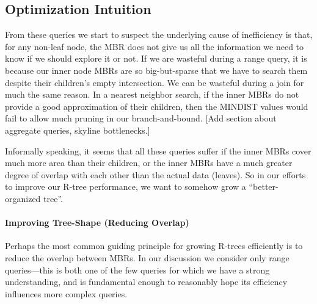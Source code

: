 \subsection{Optimization Intuition}

From these queries we start to suspect the underlying cause of inefficiency is that, for any non-leaf node, the MBR does not give us all the information we need to know if we should explore it or not.
If we are wasteful during a range query, it is because our inner node MBRs are so big-but-sparse that we have to search them despite their children's empty intersection.
We can be wasteful during a join for much the same reason.
In a nearest neighbor search, if the inner MBRs do not provide a good approximation of their children, then the MINDIST values would fail to allow much pruning in our branch-and-bound.
[Add section about aggregate queries, skyline bottlenecks.]

Informally speaking, it seems that all these queries suffer if the inner MBRs cover much more area than their children, or the inner MBRs have a much greater degree of overlap with each other than the actual data (leaves).
So in our efforts to improve our R-tree performance, we want to somehow grow a ``better-organized tree''.





\paragraph{Improving Tree-Shape (Reducing Overlap)}
Perhaps the most common guiding principle for growing R-trees efficiently is to reduce the overlap between MBRs.
In our discussion we consider only range queries---this is both one of the few queries for which we have a strong understanding, and is fundamental enough to reasonably hope its efficiency influences more complex queries.

